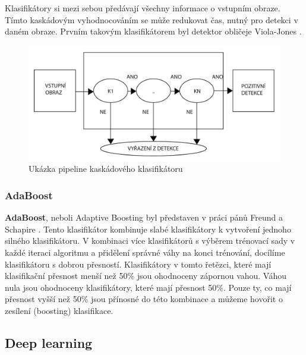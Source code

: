 Klasifikátory si mezi sebou předávají všechny informace o vstupním obraze. Tímto kaskádovým vyhodnocováním se může redukovat čas, nutný pro detekci v daném obraze. Prvním takovým klasifikátorem byl detektor obličeje Viola-Jones \cite{violajones}.  
\begin{figure}[H]
\centering
\includegraphics[width=.7\linewidth]{figures/cascadeClass.pdf}
\caption{Ukázka pipeline kaskádového klasifikátoru}
\label{fig:ccpipeline}
\end{figure}

\subsubsection*{AdaBoost}
\textbf{AdaBoost}, neboli Adaptive Boosting byl představen v práci pánů Freund a Schapire \cite{adaboost}. Tento klasifikátor kombinuje slabé klasifikátory k vytvoření jednoho silného klasifikátoru. V kombinaci více klasifikátorů s výběrem trénovací sady v každé iteraci algoritmu a přidělení správné váhy na konci trénování, docílíme klasifikátoru s dobrou přesností. Klasifikátory v tomto řetězci, které mají klasifikační přesnost menší než 50\% jsou ohodnoceny zápornou vahou. Váhou nula jsou ohodnoceny klasifikátory, které mají přesnost 50\%. Pouze ty, co mají přesnost vyšší než 50\% jsou přínosné do této kombinace a můžeme hovořit o zesílení (boosting) klasifikace. 

\subsection{Deep learning}